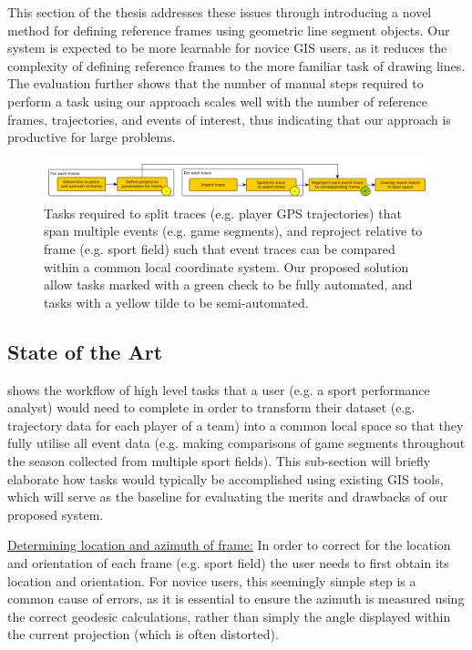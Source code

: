 This section of the thesis addresses these issues through introducing a novel method for defining reference frames using geometric line segment objects. Our system is expected to be more learnable for novice GIS users, as it reduces the complexity of defining reference frames to the more familiar task of drawing lines. The evaluation further shows that the number of manual steps required to perform a task using our approach scales well with the number of reference frames, trajectories, and events of interest, thus indicating that our approach is productive for large problems.


\begin{landscape}
\begin{figure}
\includegraphics[width=1.0\linewidth]{figs/paper/manual-process}
\caption{Tasks required to split traces (e.g. player GPS trajectories) that span multiple events (e.g. game segments), and reproject relative to frame (e.g. sport field) such that event traces can be compared within a common local coordinate system. Our proposed solution allow tasks marked with a green check to be fully automated, and tasks with a yellow tilde to be semi-automated.}
\label{fig:manual-process}
\end{figure}
\end{landscape}

\subsection{State of the Art}

 shows the workflow of high level tasks that a user (e.g. a sport performance analyst) would need to complete in order to transform their dataset (e.g. trajectory data for each player of a team) into a common local space so that they fully utilise all event data (e.g. making comparisons of game segments throughout the season collected from multiple sport fields). This sub-section will briefly elaborate how tasks would typically be accomplished using existing GIS tools, which will serve as the baseline for evaluating the merits and drawbacks of our proposed system.

\ul{Determining location and azimuth of frame:} In order to correct for the location and orientation of each frame (e.g. sport field) the user needs to first obtain its location and orientation. For novice users, this seemingly simple step is a common cause of errors, as it is essential to ensure the azimuth is measured using the correct geodesic calculations, rather than simply the angle displayed within the current projection (which is often distorted).


